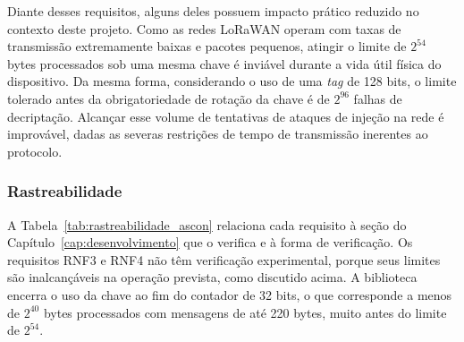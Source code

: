 Diante desses requisitos, alguns deles possuem impacto prático reduzido no contexto deste projeto. Como as redes LoRaWAN operam com taxas de transmissão extremamente baixas e pacotes pequenos, atingir o limite de $2^{54}$ bytes processados sob uma mesma chave é inviável durante a vida útil física do dispositivo. Da mesma forma, considerando o uso de uma \textit{tag} de 128 bits, o limite tolerado antes da obrigatoriedade de rotação da chave é de $2^{96}$ falhas de decriptação. Alcançar esse volume de tentativas de ataques de injeção na rede é improvável, dadas as severas restrições de tempo de transmissão inerentes ao protocolo.

\subsubsection{Rastreabilidade}
A Tabela~\ref{tab:rastreabilidade_ascon} relaciona cada requisito à seção do Capítulo~\ref{cap:desenvolvimento} que o verifica e à forma de verificação. Os requisitos RNF3 e RNF4 não têm verificação experimental, porque seus limites são inalcançáveis na operação prevista, como discutido acima. A biblioteca encerra o uso da chave ao fim do contador de 32 bits, o que corresponde a menos de $2^{40}$ bytes processados com mensagens de até 220 bytes, muito antes do limite de $2^{54}$.

